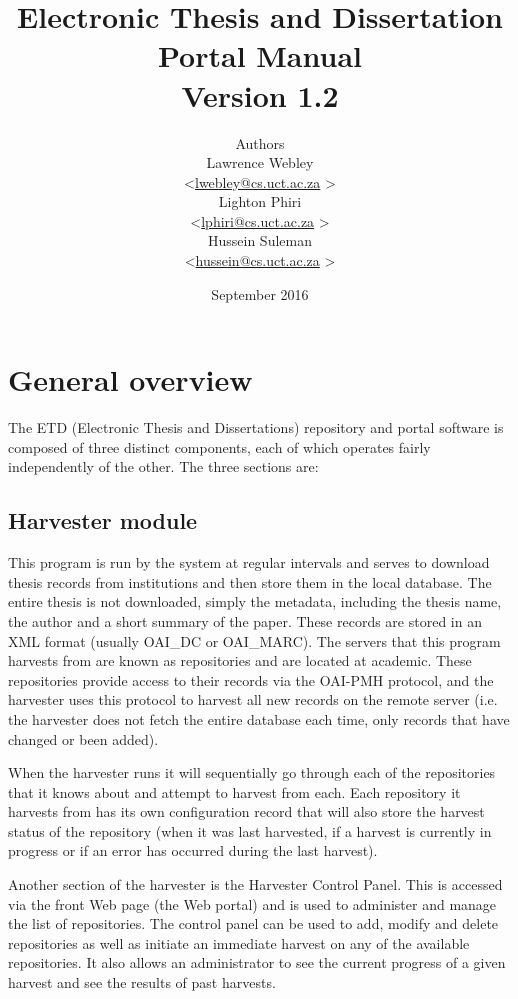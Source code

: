 \documentclass[a4paper,11pt]{article}
\title{Electronic Thesis and Dissertation Portal Manual\\Version 1.2}
\author{
Authors\\
Lawrence Webley\\
\textless \href{mailto:lwebley@cs.uct.ac.za}{lwebley@cs.uct.ac.za} \textgreater \\
Lighton Phiri\\
\textless \href{mailto:lphiri@cs.uct.ac.za}{lphiri@cs.uct.ac.za} \textgreater \\
Hussein Suleman\\ 
\textless \href{mailto:hussein@cs.uct.ac.za}{hussein@cs.uct.ac.za} \textgreater \\
}
\date
{
September 2016
}
\begin{document}
\maketitle
\thispagestyle{empty}
\newpage
\tableofcontents
\thispagestyle{empty}
\newpage

\section{General overview}

The ETD (Electronic Thesis and Dissertations) repository and portal software is composed of three distinct components, each of which operates fairly independently of the other. The three sections are:

\subsection{Harvester module}

This program is run by the system at regular intervals and serves to download thesis records from institutions and then store them in the local database. The entire thesis is not downloaded, simply the metadata, including the thesis name, the author and a short summary of the paper. These records are stored in an XML format (usually OAI\_DC or OAI\_MARC). The servers that this program harvests from are known as repositories and are located at academic. These repositories provide access to their records via the OAI-PMH protocol, and the harvester uses this protocol to harvest all new records on the remote server (i.e. the harvester does not fetch the entire database each time, only records that have changed or been added).

When the harvester runs it will sequentially go through each of the repositories that it knows about and attempt to harvest from each. Each repository it harvests from has its own configuration record that will also store the harvest status of the repository (when it was last harvested, if a harvest is currently in progress or if an error has occurred during the last harvest).

Another section of the harvester is the Harvester Control Panel. This is accessed via the front Web page (the Web portal) and is used to administer and manage the list of repositories. The control panel can be used to add, modify and delete repositories as well as initiate an immediate harvest on any of the available repositories. It also allows an administrator to see the current progress of a given harvest and see the results of past harvests.
\end{document}
